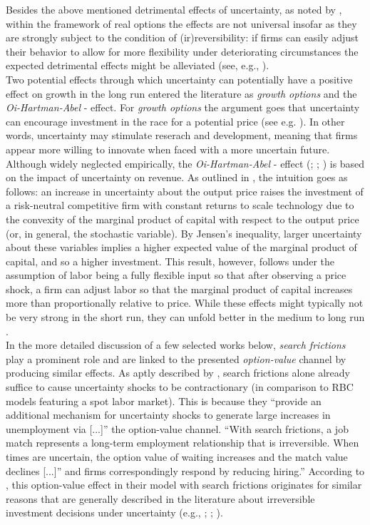 \documentclass[a4paper,11pt,listof=nochaptergap,oneside,pointednumbers,bibtotoc,bigheadings,liststotoc]{scrbook}
\theoremstyle{mysatz}
\theoremstyle{mydefinition}
\theoremstyle{mytheorem}
\theoremstyle{mybemerkung}
\begin{document}
Besides the above mentioned detrimental effects of uncertainty, as noted by \citet{bloom:14}, within the framework of real options the effects are not universal insofar as they are strongly subject to the condition of (ir)reversibility: if firms can easily adjust their behavior to allow for more flexibility under deteriorating circumstances the expected detrimental effects might be alleviated (see, e.g., \citealp{vallettaandbengali:13}).\\

Two potential effects through which uncertainty can potentially have a positive effect on growth in the long run entered the literature as \textit{growth options} and the \textit{Oi-Hartman-Abel} - effect. For \textit{growth options} the argument goes that uncertainty can encourage investment in the race for a potential price (see e.g. \citealp{ilhanstrange:96}). In other words, uncertainty may stimulate reserach and development, meaning that firms appear more willing to innovate when faced with a more uncertain future. Although widely neglected empirically, the \textit{Oi-Hartman-Abel} - effect (\citealp{oi:61}; \citealp{hartman:72}; \citealp{abel:83}) is based on the impact of uncertainty on revenue. As outlined in \citet{saltarietal:00}, the intuition goes as follows: an increase in uncertainty about the output price raises the investment of a risk-neutral competitive firm with constant returns to scale technology due to the convexity of the marginal product of capital with respect to the output price (or, in general, the stochastic variable). By Jensen’s inequality, larger uncertainty about these variables implies a higher expected value of the marginal product of capital, and so a higher investment. This result, however, follows under the assumption of labor being a fully flexible input so that after observing a price shock, a firm can adjust labor so that the marginal product of capital increases more than proportionally relative to price. While these effects might typically not be very strong in the short run, they can unfold better in the medium to long run \citep{bloom:14}.\\

In the more detailed discussion of a few selected works below, \textit{search frictions} play a prominent role and are linked to the presented \textit{option-value} channel by producing similar effects. As aptly described by \citet{leducandliu:16}, search frictions alone already suffice to cause uncertainty shocks to be contractionary (in comparison to RBC models featuring a spot labor market). This is because they ``provide an additional mechanism for uncertainty shocks to generate large increases in unemployment via [...]'' the option-value channel. ``With search frictions, a job match represents a long-term employment relationship that is irreversible. When times are uncertain, the option value of waiting increases and the match value declines [...]'' and firms correspondingly respond by reducing hiring.'' According to \citet{leducandliu:16}, this option-value effect in their model with search frictions originates for similar reasons that are generally described in the literature about irreversible investment decisions under uncertainty (e.g., \citealp{bernanke:83}; \citealp{bloom:09}; \citealp{bloometal:12}).
\end{document}
